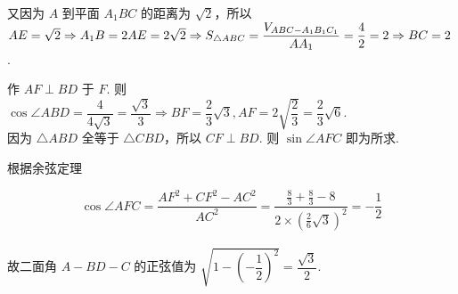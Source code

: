 \documentclass[UTF8]{ctexart}
\begin{document}
\noindent 又因为 $A$ 到平面 $A_1BC$ 的距离为 $\sqrt 2$，所以 $AE=\sqrt 2 \\
\noindent  \Rightarrow A_1B=2AE=2 \sqrt 2 \Rightarrow S_{\triangle ABC}=\dfrac{V_{ABC-A_1B_1C_1}}{AA_1}=\dfrac{4}{2}=2 \Rightarrow BC=2$.

\noindent 作 $AF \perp BD$ 于 $F$. 则 $\cos \angle ABD=\dfrac{4}{4 \sqrt 3}=\dfrac{\sqrt 3}{3} \Rightarrow BF=\dfrac{2}{3} \sqrt 3, AF=2 \sqrt{\dfrac{2}{3}}=\dfrac{2}{3} \sqrt 6$. \\

\noindent 因为 $\triangle ABD$ 全等于 $\triangle CBD$，所以 $CF \perp BD$. 则 $\sin \angle AFC$ 即为所求.

\noindent 根据余弦定理

$$\cos \angle AFC=\dfrac{AF^2+CF^2-AC^2}{AC^2}=\dfrac{\frac{8}{3}+\frac{8}{3}-8}{2 \times (\frac{2}{6} \sqrt 3)^2}=-\dfrac{1}{2}$$ \\

\noindent 故二面角 $A-BD-C$ 的正弦值为 $\sqrt{1-(-\dfrac{1}{2})^2}=\dfrac{\sqrt 3}{2}$.
\end{document}

